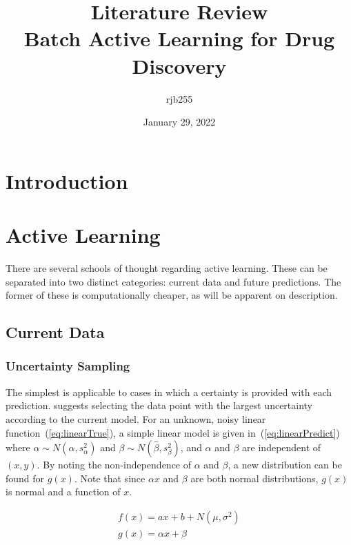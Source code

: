 \documentclass[a4paper, english]{article}
\begin{document}
\title{\Large{\textbf{Literature Review}}\\Batch Active Learning for Drug Discovery}
\author{rjb255}
\date{January 29, 2022}

\maketitle

\begin{abstract}
    \blindtext[1]{}
\end{abstract}

\section{Introduction}
\blindtext[2]{}

\section{Active Learning}\label{ch:Active Learning}
There are several schools of thought regarding active learning. These can be separated into two distinct categories: current data and future predictions. The former of these is computationally cheaper, as will be apparent on description.

\subsection{Current Data}
\subsubsection{Uncertainty Sampling}
The simplest is applicable to cases in which a certainty is provided with each prediction. \textcite{LitRev_2009} suggests selecting the data point with the largest uncertainty according to the current model. For an unknown, noisy linear function~(\ref{eq:linearTrue}), a simple linear model is given in~(\ref{eq:linearPredict}) where $\alpha\sim{}N(\hat{\alpha}, s^2_\alpha)$ and $\beta\sim{}N(\hat{\beta},s^2_\beta)$, and $\alpha$ and $\beta$ are independent of $(x,y)$. By noting the non-independence of $\alpha$ and $\beta$, a new distribution can be found for $g(x)$. Note that since $\alpha{}x$ and $\beta$ are both normal distributions, $g(x)$ is normal and a function of $x$.

\begin{eqnarray}
    \label{eq:linearTrue}
    f(x)=a x+b + N(\mu, \sigma^2)\\
    \label{eq:linearPredict}
    g(x)=\alpha{}x+\beta{}
\end{eqnarray}
\end{document}
